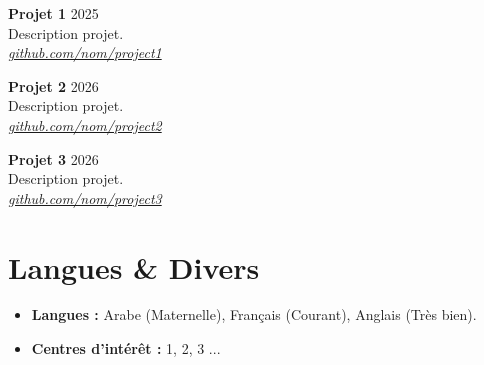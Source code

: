 \documentclass[a4paper,10pt]{article}
\begin{document}
\textbf{Projet 1} \hfill 2025 \\
Description projet. \\
\textit{\href{https://github.com/nom/project1}{github.com/nom/project1}}

\vspace{3pt}
\textbf{Projet 2} \hfill 2026 \\
Description projet.\\
\textit{\href{https://github.com/nom/project2}{github.com/nom/project2}}

\vspace{3pt}
\textbf{Projet 3} \hfill 2026 \\
Description projet.\\
\textit{\href{https://github.com/nom/project3}{github.com/nom/project3}}


\section{Langues \& Divers}
\begin{itemize}[leftmargin=*, noitemsep, topsep=0pt]
    \item \textbf{Langues :} Arabe (Maternelle), Français (Courant), Anglais (Très bien).
    \item \textbf{Centres d'intérêt :} 1, 2, 3 ...
\end{itemize}
\end{document}
